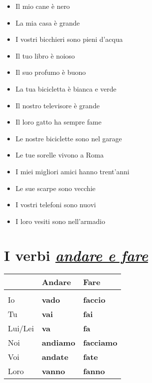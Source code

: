 \documentclass[letter,11pt]{article}
\begin{document}
\vskip 0.5in
\begin{multicols}{2}
\begin{itemize}
    \item Il mio cane è nero
    \item La mia casa è grande
    \item I vostri bicchieri sono pieni d'acqua
    \item Il tuo libro è noioso
    \item Il suo profumo è buono
    \item La tua bicicletta è bianca e verde
    \item Il nostro televisore è grande
    \item Il loro gatto ha sempre fame
    \item Le nostre biciclette sono nel garage
    \item Le tue sorelle vivono a Roma
    \item I miei migliori amici hanno trent'anni
    \item Le sue scarpe sono vecchie
    \item I vostri telefoni sono nuovi
    \item I loro vesiti sono nell'armadio


\end{itemize}
\end{multicols}

\vskip 0.2in
\section*{I verbi \underline{\emph{andare e fare}}}
\vskip 0.2in

\begin{tabular}{ |p{3cm}| p{2cm}| p{2cm}| }
      & Andare  & Fare  \\
    \hline
    \hline
     &  &   \\ \hline
    Io      & {\bf vado}   & {\bf faccio}    \\ \hline
    Tu      & {\bf vai}    & {\bf fai}       \\ \hline
    Lui/Lei & {\bf va}     & {\bf fa}        \\ \hline
    Noi     & {\bf andiamo} & {\bf facciamo}  \\ \hline
    Voi     & {\bf andate}  & {\bf fate}      \\ \hline
    Loro    & {\bf vanno}   & {\bf fanno}     \\ \hline
    \hline
\end{tabular}
\end{document}

